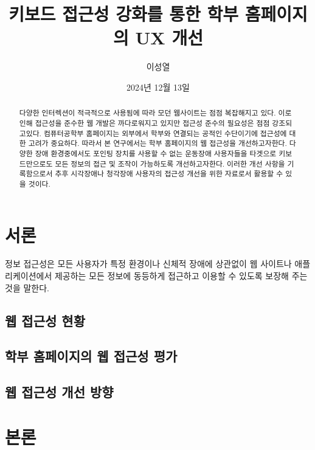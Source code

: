 \documentclass[ko]{snu-cse-bsc-thesis}
\title{키보드 접근성 강화를 통한 학부 홈페이지의 UX 개선}
\author{이성열}
\date{2024년 12월 13일}
\begin{document}
\maketitle

\begin{abstract}
다양한 인터렉션이 적극적으로 사용됨에 따라 모던 웹사이트는 점점 복잡해지고 있다. 이로인해 접근성을 준수한 웹 개발은 까다로워지고 있지만 접근성 준수의 필요성은 점점 강조되고있다. 컴퓨터공학부 홈페이지는 외부에서 학부와 연결되는 공적인 수단이기에 접근성에 대한 고려가 중요하다. 따라서 본 연구에서는 학부 홈페이지의 웹 접근성을 개선하고자한다. 다양한 장애 환경중에서도 포인팅 장치를 사용할 수 없는 운동장애 사용자들을 타겟으로 키보드만으로도 모든 정보의 접근 및 조작이 가능하도록 개선하고자한다. 이러한 개선 사항을 기록함으로서 추후 시각장애나 청각장애 사용자의 접근성 개선을 위한 자료로서 활용할 수 있을 것이다. 
\end{abstract}

\tableofcontents
\listoffigures

\chapter{서론}

정보 접근성은 모든 사용자가 특정 환경이나 신체적 장애에 상관없이 웹 사이트나 애플리케이션에서 제공하는
모든 정보에 동등하게 접근하고 이용할 수 있도록 보장해 주는 것을 말한다.

\section{웹 접근성 현황}

\section{학부 홈페이지의 웹 접근성 평가}

\section{웹 접근성 개선 방향}

\chapter{본론}\label{chap:body}

\end{document}
